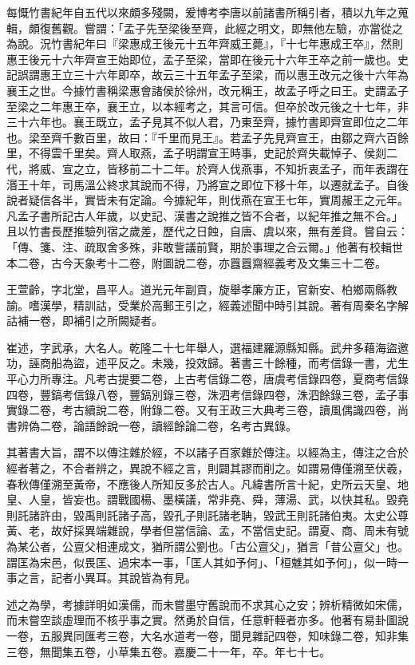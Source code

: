 \begin{pinyinscope}
每慨竹書紀年自五代以來頗多殘闕，爰博考李唐以前諸書所稱引者，積以九年之蒐輯，頗復舊觀。嘗謂：「孟子先至梁後至齊，此經之明文，即無他左驗，亦當從之為說。況竹書紀年曰『梁惠成王後元十五年齊威王薨』，『十七年惠成王卒』，然則惠王後元十六年齊宣王始即位，孟子至梁，當即在後元十六年王卒之前一歲也。史記誤謂惠王立三十六年即卒，故云三十五年孟子至梁，而以惠王改元之後十六年為襄王之世。今據竹書稱梁惠會諸侯於徐州，改元稱王，故孟子呼之曰王。史謂孟子至梁之二年惠王卒，襄王立，以本經考之，其言可信。但卒於改元後之十七年，非三十六年也。襄王既立，孟子見其不似人君，乃東至齊，據竹書即齊宣即位之二年也。梁至齊千數百里，故曰：『千里而見王』。若孟子先見齊宣王，由鄒之齊六百餘里，不得雲千里矣。齊人取燕，孟子明謂宣王時事，史記於齊失載悼子、侯剡二代，將威、宣之立，皆移前二十二年。於齊人伐燕事，不知折衷孟子，而年表謂在湣王十年，司馬溫公終求其說而不得，乃將宣之即位下移十年，以遷就孟子。自後說者疑信各半，實皆未有定論。今據紀年，則伐燕在宣王七年，實周赧王之元年。凡孟子書所記古人年歲，以史記、漢書之說推之皆不合者，以紀年推之無不合。」且以竹書長歷推驗列宿之歲差，歷代之日蝕，自唐、虞以來，無有差貸。嘗自云：「傳、箋、注、疏取舍多殊，非敢訾議前賢，期於事理之合云爾。」他著有校輯世本二卷，古今天象考十二卷，附圖說二卷，亦囂囂齋經義考及文集三十二卷。

王萱齡，字北堂，昌平人。道光元年副貢，旋舉孝廉方正，官新安、柏鄉兩縣教諭。嗜漢學，精訓詁，受業於高郵王引之，經義述聞中時引其說。著有周秦名字解詁補一卷，即補引之所闕疑者。

崔述，字武承，大名人。乾隆二十七年舉人，選福建羅源縣知縣。武弁多藉海盜邀功，誣商船為盜，述平反之。未幾，投效歸。著書三十餘種，而考信錄一書，尤生平心力所專注。凡考古提要二卷，上古考信錄二卷，唐虞考信錄四卷，夏商考信錄四卷，豐鎬考信錄八卷，豐鎬別錄三卷，洙泗考信錄四卷，洙泗餘錄三卷，孟子事實錄二卷，考古續說二卷，附錄二卷。又有王政三大典考三卷，讀風偶識四卷，尚書辨偽二卷，論語餘說一卷，讀經餘論二卷，名考古異錄。

其著書大旨，謂不以傳注雜於經，不以諸子百家雜於傳注。以經為主，傳注之合於經者著之，不合者辨之，異說不經之言，則闢其謬而削之。如謂易傳僅溯至伏羲，春秋傳僅溯至黃帝，不應後人所知反多於古人。凡緯書所言十紀，史所云天皇、地皇、人皇，皆妄也。謂戰國楊、墨橫議，常非堯、舜，薄湯、武，以快其私。毀堯則託諸許由，毀禹則託諸子高，毀孔子則託諸老聃，毀武王則託諸伯夷。太史公尊黃、老，故好採異端雜說，學者但當信論、孟，不當信史記。謂夏、商、周未有號為某公者，公亶父相連成文，猶所謂公劉也。「古公亶父」，猶言「昔公亶父」也。謂匡為宋邑，似畏匡、過宋本一事，「匡人其如予何」、「桓魋其如予何」，似一時一事之言，記者小異耳。其說皆為有見。

述之為學，考據詳明如漢儒，而未嘗墨守舊說而不求其心之安；辨析精微如宋儒，而未嘗空談虛理而不核乎事之實。然勇於自信，任意軒輊者亦多。他著有易卦圖說一卷，五服異同匯考三卷，大名水道考一卷，聞見雜記四卷，知味錄二卷，知非集三卷，無聞集五卷，小草集五卷。嘉慶二十一年，卒。年七十七。


\end{pinyinscope}
